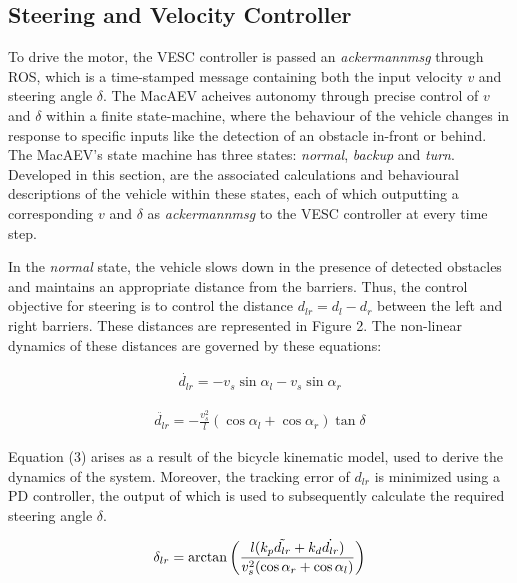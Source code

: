 \documentclass[conference]{IEEEtran}
\begin{document}
\subsection{Steering and Velocity Controller}
To drive the motor, the VESC controller is passed an \textit{ackermann\textunderscore msg} through ROS, which is a time-stamped message containing both the input velocity $v$ and steering angle $\delta$. The MacAEV acheives autonomy through precise control of $v$ and $\delta$ within a finite state-machine, where the behaviour of the vehicle changes in response to specific inputs like the detection of an obstacle in-front or behind. The MacAEV's state machine has three states: \textit{normal}, \textit{backup} and \textit{turn}. Developed in this section, are the associated calculations and behavioural descriptions of the vehicle within these states, each of which outputting a corresponding $v$ and $\delta$ as \textit{ackermann\textunderscore msg} to the VESC controller at every time step.  


In the \textit{normal} state, the vehicle slows down in the presence of detected obstacles and maintains an appropriate distance from the barriers. Thus, the control objective for steering is to control the distance $d_{lr} = d_l - d_r$ between the left and right barriers. These distances are represented in Figure 2. The non-linear dynamics of these distances are governed by these equations:


\begin{equation}
    \begin{aligned}
        \dot{d_{lr}} = -v_s \sin \alpha_l - v_s \sin \alpha_r
    \end{aligned}
\end{equation}  

\begin{equation}
    \begin{aligned}
        \ddot{d_{lr}} = -\frac{v_s^2}{l} (\cos \alpha_l + \cos \alpha_r)\tan \delta 
    \end{aligned}
\end{equation}

Equation (3) arises as a result of the bicycle kinematic model, used to derive the dynamics of the system. Moreover, the tracking error of $d_{lr}$ is minimized using a PD controller, the output of which is used to subsequently calculate the required steering angle $\delta$. 

\begin{equation}
        \delta_{lr} = \arctan \left( \frac{l ( k_p \Tilde{d_{lr}} +k_d \dot{d_{lr}} )}{v_s^2(\cos \alpha_{r} + \cos \alpha_{l} )} \right) 
\end{equation}
\end{document}
